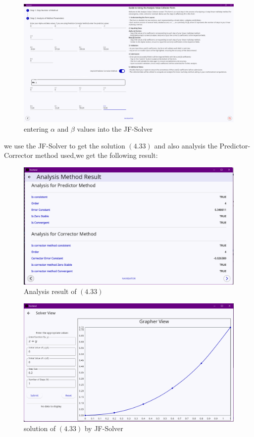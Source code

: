 \begin{figure}[htbp]
    \centering
    \includegraphics[width=1\textwidth]{chapters/4/image/solver_5.png}
    \caption{entering $\alpha$ and $\beta$ values into the JF-Solver }
\end{figure}


we use the JF-Solver to get the solution $(4.33)$ and also analysis the Predictor-Corrector method  used,we get the following result:


\begin{figure}[htbp]
    \centering
    \includegraphics[width=1\textwidth]{chapters/4/image/solver_6.png}
    \caption{Analysis result of $(4.33)$ }
\end{figure}


\begin{figure}[htbp]
    \centering
    \includegraphics[width=1\textwidth]{chapters/4/image/solver_7.png}
    \caption{solution of $(4.33)$ by JF-Solver}
\end{figure}


